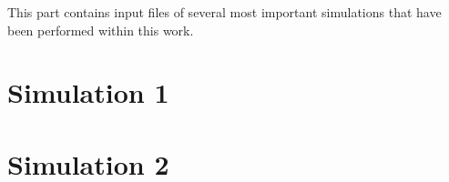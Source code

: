 This part contains input files of several most important simulations that have been performed within this work.  

\section{Simulation 1}

\section{Simulation 2}